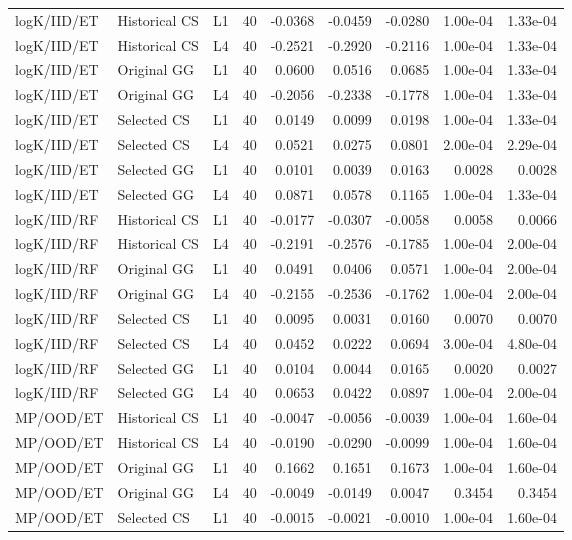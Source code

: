 \documentclass[9pt]{article}
\begin{document}
\begin{longtable}{p{2.0cm}p{1.35cm}ccrrrrr}
logK/IID/ET & Historical CS & L1 & 40 & -0.0368 & -0.0459 & -0.0280 & 1.00e-04 & 1.33e-04\\
logK/IID/ET & Historical CS & L4 & 40 & -0.2521 & -0.2920 & -0.2116 & 1.00e-04 & 1.33e-04\\
logK/IID/ET & Original GG & L1 & 40 & 0.0600 & 0.0516 & 0.0685 & 1.00e-04 & 1.33e-04\\
logK/IID/ET & Original GG & L4 & 40 & -0.2056 & -0.2338 & -0.1778 & 1.00e-04 & 1.33e-04\\
logK/IID/ET & Selected CS & L1 & 40 & 0.0149 & 0.0099 & 0.0198 & 1.00e-04 & 1.33e-04\\
logK/IID/ET & Selected CS & L4 & 40 & 0.0521 & 0.0275 & 0.0801 & 2.00e-04 & 2.29e-04\\
logK/IID/ET & Selected GG & L1 & 40 & 0.0101 & 0.0039 & 0.0163 & 0.0028 & 0.0028\\
logK/IID/ET & Selected GG & L4 & 40 & 0.0871 & 0.0578 & 0.1165 & 1.00e-04 & 1.33e-04\\
logK/IID/RF & Historical CS & L1 & 40 & -0.0177 & -0.0307 & -0.0058 & 0.0058 & 0.0066\\
logK/IID/RF & Historical CS & L4 & 40 & -0.2191 & -0.2576 & -0.1785 & 1.00e-04 & 2.00e-04\\
logK/IID/RF & Original GG & L1 & 40 & 0.0491 & 0.0406 & 0.0571 & 1.00e-04 & 2.00e-04\\
logK/IID/RF & Original GG & L4 & 40 & -0.2155 & -0.2536 & -0.1762 & 1.00e-04 & 2.00e-04\\
logK/IID/RF & Selected CS & L1 & 40 & 0.0095 & 0.0031 & 0.0160 & 0.0070 & 0.0070\\
logK/IID/RF & Selected CS & L4 & 40 & 0.0452 & 0.0222 & 0.0694 & 3.00e-04 & 4.80e-04\\
logK/IID/RF & Selected GG & L1 & 40 & 0.0104 & 0.0044 & 0.0165 & 0.0020 & 0.0027\\
logK/IID/RF & Selected GG & L4 & 40 & 0.0653 & 0.0422 & 0.0897 & 1.00e-04 & 2.00e-04\\
MP/OOD/ET & Historical CS & L1 & 40 & -0.0047 & -0.0056 & -0.0039 & 1.00e-04 & 1.60e-04\\
MP/OOD/ET & Historical CS & L4 & 40 & -0.0190 & -0.0290 & -0.0099 & 1.00e-04 & 1.60e-04\\
MP/OOD/ET & Original GG & L1 & 40 & 0.1662 & 0.1651 & 0.1673 & 1.00e-04 & 1.60e-04\\
MP/OOD/ET & Original GG & L4 & 40 & -0.0049 & -0.0149 & 0.0047 & 0.3454 & 0.3454\\
MP/OOD/ET & Selected CS & L1 & 40 & -0.0015 & -0.0021 & -0.0010 & 1.00e-04 & 1.60e-04\\

\end{longtable}
\end{document}

